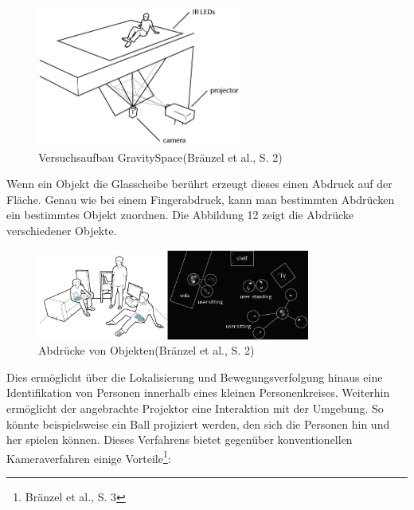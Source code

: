 \begin{figure}[H]
	\centering
	\includegraphics[width=0.6\textwidth]{pictures/hpi1}
	\caption{Versuchsaufbau GravitySpace(Bränzel et al., S. 2)}
\end{figure}

Wenn ein Objekt die Glasscheibe berührt erzeugt dieses einen Abdruck auf der Fläche. Genau wie bei einem Fingerabdruck, kann man bestimmten Abdrücken ein bestimmtes Objekt zuordnen. Die Abbildung 12 zeigt die Abdrücke verschiedener Objekte.

\begin{figure}[H]
	\centering
	\includegraphics[width=0.8\textwidth]{pictures/hpi2}
	\caption{Abdrücke von Objekten(Bränzel et al., S. 2)}
\end{figure}

Dies ermöglicht über die Lokalisierung und Bewegungsverfolgung hinaus eine Identifikation von Personen innerhalb eines kleinen Personenkreises. Weiterhin ermöglicht der angebrachte Projektor eine Interaktion mit der Umgebung. So könnte beispielsweise ein Ball projiziert werden, den sich die Personen hin und her spielen können.\newline\newline
Dieses Verfahrens bietet gegenüber konventionellen Kameraverfahren einige Vorteile\footnote{Bränzel et al., S. 3}:

